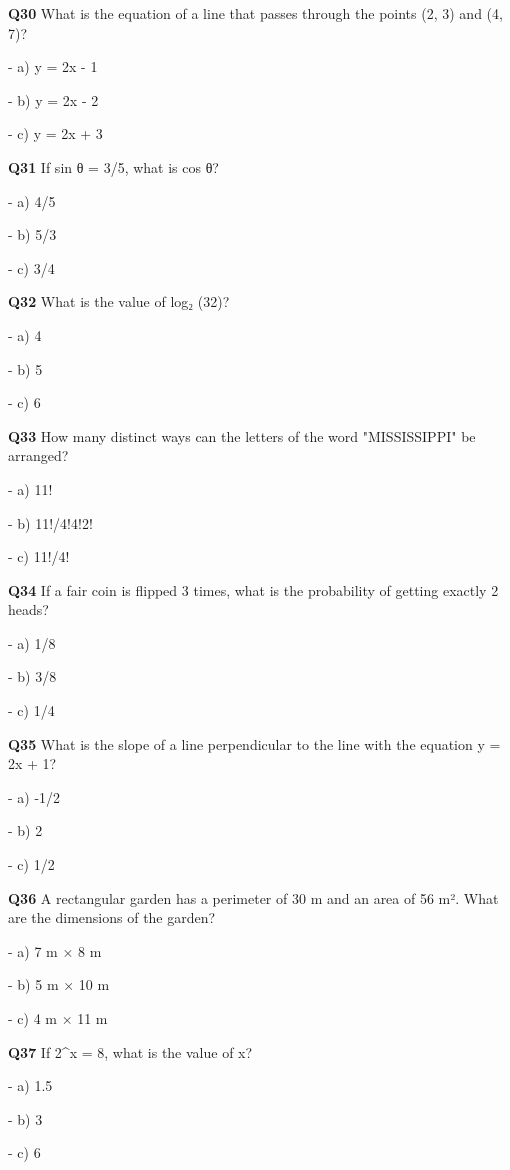 \textbf{Q30} What is the equation of a line that passes through the points (2, 3) and (4, 7)?\par
\quad - a) y = 2x - 1\par
\quad - b) y = 2x - 2\par
\quad - c) y = 2x + 3\par

\textbf{Q31} If sin θ = 3/5, what is cos θ?\par
\quad - a) 4/5\par
\quad - b) 5/3\par
\quad - c) 3/4\par

\textbf{Q32} What is the value of log₂ (32)?\par
\quad - a) 4\par
\quad - b) 5\par
\quad - c) 6\par

\textbf{Q33} How many distinct ways can the letters of the word "MISSISSIPPI" be arranged?\par
\quad - a) 11!\par
\quad - b) 11!/4!4!2!\par
\quad - c) 11!/4!\par

\textbf{Q34} If a fair coin is flipped 3 times, what is the probability of getting exactly 2 heads?\par
\quad - a) 1/8\par
\quad - b) 3/8\par
\quad - c) 1/4\par

\textbf{Q35} What is the slope of a line perpendicular to the line with the equation y = 2x + 1?\par
\quad - a) -1/2\par
\quad - b) 2\par
\quad - c) 1/2\par

\textbf{Q36} A rectangular garden has a perimeter of 30 m and an area of 56 m². What are the dimensions of the garden?\par
\quad - a) 7 m × 8 m\par
\quad - b) 5 m × 10 m\par
\quad - c) 4 m × 11 m\par

\textbf{Q37} If 2^x = 8, what is the value of x?\par
\quad - a) 1.5\par
\quad - b) 3\par
\quad - c) 6\par

